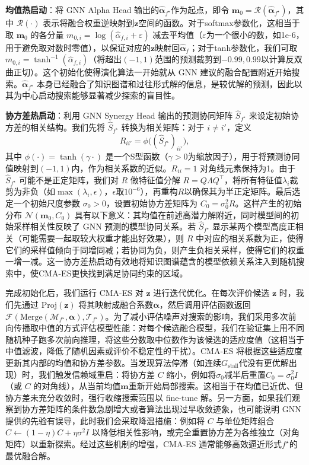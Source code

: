 \documentclass[../main.tex]{subfiles}
\begin{document}
\textbf{均值热启动}：将 GNN Alpha Head 输出的$\hat{\boldsymbol{\alpha}}_{f^\star}$作为起点，即令 $\mathbf{m}_0 = \mathcal{R}(\hat{\boldsymbol{\alpha}}_{f^\star})$，其中 $\mathcal{R}(\cdot)$ 表示将融合权重逆映射到$\mathbf{z}$空间的函数。对于softmax参数化，这相当于取 $\mathbf{m}_0$ 的各分量 $m_{0,i} = \log(\hat{\alpha}_{f,i} + \varepsilon)$ 减去平均值（$\varepsilon$为一个很小的数，如1e-6，用于避免取对数时零值），以保证对应的$\mathbf{z}$映射回$\hat{\boldsymbol{\alpha}}_{f}$；对于tanh参数化，我们可取 $m_{0,i} = \tanh^{-1}(\hat{\alpha}_{f,i})$（将超出$(-1,1)$范围的预测裁剪到$-0.99,0.99$以计算反双曲正切）。这个初始化使得演化算法一开始就从 GNN 建议的融合配置附近开始搜索。$\hat{\boldsymbol{\alpha}}_{f^\star}$ 本身已经融合了知识图谱和过往形式解的信息，是较优解的预测，因此以其为中心启动搜索能够显著减少探索的盲目性。

\textbf{协方差热启动}：利用 GNN Synergy Head 输出的预测协同矩阵 $\hat{S}_{f^\star}$ 来设定初始协方差的相关结构。我们先将 $\hat{S}_{f^\star}$ 转换为相关矩阵：对于 $i \neq i'$，定义
\begin{equation}
	R_{ii'} = \phi\Big((\hat{S}_{f^\star})_{ii'}\Big),
\end{equation}
其中 $\phi(\cdot) = \tanh(\gamma \cdot)$ 是一个S型函数（$\gamma>0$为缩放因子），用于将预测协同值映射到$(-1,1)$内，作为相关系数的近似。$R_{ii}=1$ 对角线元素保持为1。由于 $\hat{S}_{f^\star}$ 可能不是正定矩阵，我们对 $R$ 做特征值分解 $R=Q\Lambda Q^\top$，将所有特征值$\lambda_i$裁剪为非负（如$\max(\lambda_i,\epsilon)$，$\epsilon$取$10^{-6}$），再重构$R$以确保其为半正定矩阵。最后选定一个初始尺度参数 $\sigma_0>0$，设置初始协方差矩阵为 $C_0 = \sigma_0^2 R$。这样产生的初始分布 $\mathcal{N}(\mathbf{m}_0, C_0)$ 具有以下意义：其均值在前述高潜力解附近，同时模型间的初始采样相关性反映了 GNN 预测的模型协同关系。若 $\hat{S}_{f^\star}$ 显示某两个模型高度正相关（可能需要一起取较大权重才能出好效果），则 $R$ 中对应的相关系数为正，使得它们的采样值倾向于同增同减；若协同为负，则产生负相关采样，使得它们的权重一增一减。这一协方差热启动有效地将知识图谱蕴含的模型依赖关系注入到随机搜索中，使CMA-ES更快找到满足协同约束的区域。

完成初始化后，我们运行 CMA-ES 对 $\mathbf{z}$ 进行迭代优化。在每次评价候选 $\mathbf{z}$ 时，我们先通过 $\mathrm{Proj}(\mathbf{z})$ 将其映射成融合系数$\boldsymbol{\alpha}$，然后调用评估函数返回 $\mathcal{F}(\mathrm{Merge}(\mathcal{M}_{f^\star}, \boldsymbol{\alpha}), \mathcal{T}_{f^\star})$。为了减小评估噪声对搜索的影响，我们采用多次前向传播取中值的方式评估模型性能：对每个候选融合模型，我们在验证集上用不同随机种子跑多次前向推理，将这些分数取中位数作为该候选的适应度值（这相当于中值滤波，降低了随机因素或评价不稳定性的干扰）。CMA-ES 将根据这些适应度更新其内部的均值和协方差参数。当发现算法停滞（如连续$G_{\text{stall}}$代没有更优解出现）时，我们触发信赖域重启：将协方差 $C$ 缩小，例如将$\sigma_0$减半后重置$C_0=\sigma_0^2 I$（或 $C$ 的对角线），从当前均值$\mathbf{m}$重新开始局部搜索。这相当于在均值已近优、但协方差未充分收敛时，强行收缩搜索范围以 fine-tune 解。另一方面，如果我们观察到协方差矩阵的条件数急剧增大或者算法出现过早收敛迹象，也可能说明 GNN 提供的先验有误导，此时我们会采取降温措施：例如将 $C$ 与单位矩阵组合 $C \leftarrow (1-\eta)C + \eta \sigma^2 I$ 以降低相关性影响，或完全重置协方差为各维独立（对角矩阵）以重新探索。经过这些机制的增强，CMA-ES 通常能够高效逼近形式$f^\star$的最优融合解。
\end{document}
